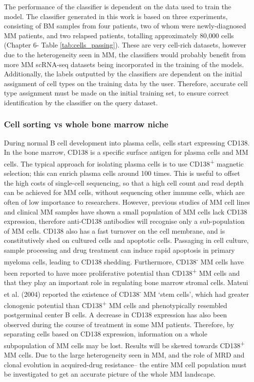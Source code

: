 The performance of the classifier is dependent on the data used to train the model.
The classifier generated in this work is based on three experiments, consisting of BM samples from four patients, two of whom were newly-diagnosed MM patients, and two relapsed patients, totalling approximately 80,000 cells (Chapter 6- Table \ref{tab:cells_passing}).
These are very cell-rich datasets, however due to the heterogeneity seen in MM, the classifiers would probably benefit from more MM scRNA-seq datasets being incorporated in the training of the models.
Additionally, the labels outputted by the classifiers are dependent on the initial assignment of cell types on the training data by the user.
Therefore, accurate cell type assignment must be made on the initial training set, to ensure correct identification by the classifier on the query dataset.

\subsubsection{Cell sorting vs whole bone marrow niche}
During normal B cell development into plasma cells, cells start expressing CD138.
In the bone marrow, CD138 is a specific surface antigen for plasma cells and MM cells\cite{kawano2012multiple}.
The typical approach for isolating plasma cells is to use CD138\textsuperscript{+} magnetic selection;
this can enrich plasma cells around 100 times\cite{bansal2021impact}.
This is useful to offset the high costs of single-cell sequencing, so that a high cell count and read depth can be achieved for MM cells, without sequencing other immune cells, which are often of low importance to researchers.
However, previous studies of MM cell lines and clinical MM samples have shown a small population of MM cells lack CD138 expression\cite{matsui2004characterization}, therefore anti-CD138 antibodies will recognise only a sub-population of MM cells.
CD138 also has a fast turnover on the cell membrane, and is constitutively shed on cultured cells and apoptotic cells\cite{bansal2021impact}.
Passaging in cell culture, sample processing and drug treatment can induce rapid apoptosis in primary myeloma cells, leading to CD138 shedding.
Furthermore, CD138\textsuperscript{-} MM cells have been reported to have more proliferative potential than CD138\textsuperscript{+} MM cells and that they play an important role in regulating bone marrow stromal cells\cite{reid2010characterisation, wu2015cd138}.
Matsui et al. (2004) reported the existence of CD138\textsuperscript{-} MM `stem cells', which had greater clonogenic potential than CD138\textsuperscript{+} MM cells and phenotypically resembled postgerminal center B cells\cite{matsui2004characterization}.
A decrease in CD138 expression has also been observed during the course of treatment in some MM patients\cite{kawano2012multiple}.
Therefore, by separating cells based on CD138 expression, information on a whole subpopulation of MM cells may be lost.
Results will be skewed towards CD138\textsuperscript{+} MM cells.
Due to the large heterogeneity seen in MM, and the role of MRD and clonal evolution in acquired-drug resistance-- the entire MM cell population must be investigated to get an accurate picture of the whole MM landscape.

